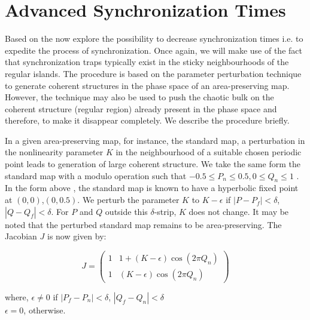 \documentclass[reprint,superscriptaddress,amsmath,amssymb,aps,pre]{revtex4-1}
\begin{document}
\section{Advanced Synchronization Times}
\label{sec:advanced}
Based on the now explore the possibility to decrease synchronization times i.e. to expedite the process of synchronization. Once again, we will make use of the fact that synchronization traps typically exist in the sticky neighbourhoods of the regular islands.  The procedure is based on the parameter perturbation technique to generate coherent structures in the phase space of an area-preserving map. However, the technique may also be used to push the chaotic bulk on the coherent structure (regular region) already present in the phase space and therefore, to make it disappear completely.  We describe the procedure briefly. 

In a given area-preserving map, for instance, the  standard map, a  perturbation in the nonlinearity parameter $K$ in the neighbourhood of a suitable chosen periodic point leads to generation of large coherent structure.   We take the same form the standard map with a modulo operation such that $-0.5 \leq P_n \leq 0.5, 0\leq Q_n \leq 1$ . In the form above \cite{FN1}, the standard map is known to have a hyperbolic fixed point at $(0,0)$,$(0,0.5)$. We perturb the parameter $K$ to $K-\epsilon$ if $|P - P_f| < \delta$, $|Q-Q_f| < \delta$. For $P$ and $Q$ outside this $\delta$-strip, $K$ does not change.  It may be noted that the perturbed standard map remains to be area-preserving. The Jacobian $J$ is now given by: 

\begin{minipage}[t]{0.45\textwidth}
	\centering
	\[ J = \left( \begin{array}{cc}
	1 & 1 + (K-\epsilon)\cos(2\pi Q_n)   \\
	1 & (K-\epsilon)\cos(2\pi Q_n) \end{array} \right)\] 
\end{minipage}

\vspace{0.4cm}
	where, $ \epsilon \neq 0$ if $|P_f - P_n| < \delta$, $|Q_f - Q_n| < \delta$\\ $\epsilon = 0$, otherwise.\\
\end{document}
